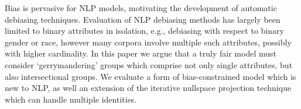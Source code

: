 Bias is pervasive for NLP models, motivating the development of automatic debiasing techniques. Evaluation of NLP debiasing methods has largely been limited to binary attributes in isolation, e.g., debiasing with respect to binary gender or race, however many corpora involve multiple such attributes, possibly with higher cardinality. In this paper we argue that a truly fair model must consider `gerrymandering' groups which comprise not only single attributes, but also intersectional groups. We evaluate a form of bias-constrained model which is new to NLP, as well an extension of the iterative nullspace projection technique which can handle multiple identities.
